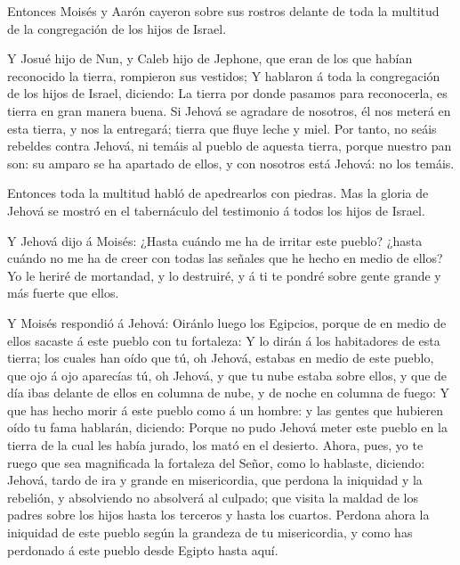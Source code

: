  Entonces Moisés y Aarón cayeron sobre sus rostros delante
de toda la multitud de la congregación de los hijos de Israel.

 Y Josué hijo de Nun, y Caleb hijo de Jephone, que eran de
los que habían reconocido la tierra, rompieron sus vestidos;
 Y hablaron á toda la congregación de los hijos de Israel,
diciendo: La tierra por donde pasamos para reconocerla, es tierra en
gran manera buena.  Si Jehová se agradare de nosotros, él
nos meterá en esta tierra, y nos la entregará; tierra que fluye leche y
miel.  Por tanto, no seáis rebeldes contra Jehová, ni temáis
al pueblo de aquesta tierra, porque nuestro pan son: su amparo se ha
apartado de ellos, y con nosotros está Jehová: no los temáis.

 Entonces toda la multitud habló de apedrearlos con
piedras. Mas la gloria de Jehová se mostró en el tabernáculo del
testimonio á todos los hijos de Israel.

 Y Jehová dijo á Moisés: ¿Hasta cuándo me ha de irritar
este pueblo? ¿hasta cuándo no me ha de creer con todas las señales que
he hecho en medio de ellos?  Yo le heriré de mortandad, y
lo destruiré, y á ti te pondré sobre gente grande y más fuerte que
ellos.

 Y Moisés respondió á Jehová: Oiránlo luego los Egipcios,
porque de en medio de ellos sacaste á este pueblo con tu fortaleza:
 Y lo dirán á los habitadores de esta tierra; los cuales
han oído que tú, oh Jehová, estabas en medio de este pueblo, que ojo á
ojo aparecías tú, oh Jehová, y que tu nube estaba sobre ellos, y que de
día ibas delante de ellos en columna de nube, y de noche en columna de
fuego:  Y que has hecho morir á este pueblo como á un
hombre: y las gentes que hubieren oído tu fama hablarán, diciendo:
 Porque no pudo Jehová meter este pueblo en la tierra de la
cual les había jurado, los mató en el desierto.  Ahora,
pues, yo te ruego que sea magnificada la fortaleza del Señor, como lo
hablaste, diciendo:  Jehová, tardo de ira y grande en
misericordia, que perdona la iniquidad y la rebelión, y absolviendo no
absolverá al culpado; que visita la maldad de los padres sobre los hijos
hasta los terceros y hasta los cuartos.  Perdona ahora la
iniquidad de este pueblo según la grandeza de tu misericordia, y como
has perdonado á este pueblo desde Egipto hasta aquí.

